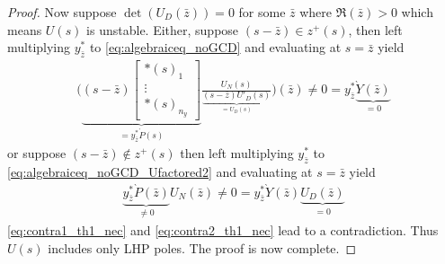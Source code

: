 \documentclass[10pt,a4paper]{amsart}
\theoremstyle{remark}
\begin{document}
\begin{proof}
Now suppose $\det(U_D(\bar{z})) = 0$ for some $\bar{z}$ where $\Re(\bar{z})>0$ which means $U(s)$ is unstable. Either, suppose $(s-\bar{z}) \in z^+(s)$, then left multiplying $y^\ast_{\bar{z}}$ to \eqref{eq:algebraiceq_noGCD} and evaluating at $s=\bar{z}$ yield
\begin{align}\label{eq:contra1_th1_nec}
  \Biggl( \underbrace{(s-\bar{z})\begin{bmatrix}
\ast(s)_1 \\
\vdots \\
\ast(s)_{n_y}
\end{bmatrix}}_{= y^\ast_{\bar{z}}\grave{P}(s)}\frac{U_N(s)}{\underbrace{(s-\bar{z})U'_D(s)}_{=U_D(s)}} \Biggr) (\bar{z}) \ne 0 = y^\ast_{\bar{z}}\underbrace{\grave{Y}(\bar{z})}_{= 0}
\end{align}
or suppose $(s-\bar{z}) \notin z^+(s)$ then left multiplying $y^\ast_{\bar{z}}$ to \eqref{eq:algebraiceq_noGCD_Ufactored2} and evaluating at $s=\bar{z}$ yield
\begin{align} \label{eq:contra2_th1_nec}
  \underbrace{y^*_{\bar{z}} \grave{P}(\bar{z})}_{\ne 0}{U_N(\bar{z})} \ne 0 = {y^*_{\bar{z}}} \grave{Y}(\bar{z}) \underbrace{U_D(\bar{z})}_{= 0}
\end{align}
\eqref{eq:contra1_th1_nec} and \eqref{eq:contra2_th1_nec}
lead to a contradiction. Thus
$U(s)$ includes only LHP poles. 
The proof is now complete. 
\end{proof}
\end{document}
